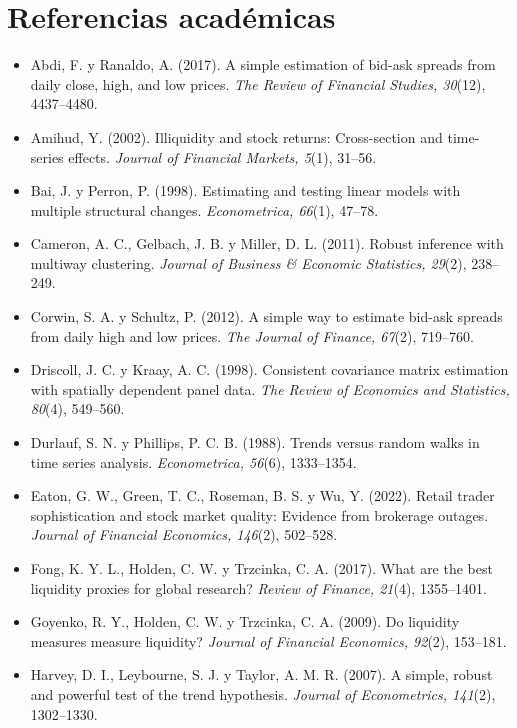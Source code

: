 \documentclass[11pt,letterpaper]{article}
\theoremstyle{definition}
\theoremstyle{plain}
\begin{document}
\section*{Referencias académicas}
\begin{itemize}[leftmargin=*,label={}]\raggedright\small
\item Abdi, F. y Ranaldo, A. (2017). A simple estimation of bid-ask spreads from daily close, high, and low prices. \emph{The Review of Financial Studies, 30}(12), 4437--4480.
\item Amihud, Y. (2002). Illiquidity and stock returns: Cross-section and time-series effects. \emph{Journal of Financial Markets, 5}(1), 31--56.
\item Bai, J. y Perron, P. (1998). Estimating and testing linear models with multiple structural changes. \emph{Econometrica, 66}(1), 47--78.
\item Cameron, A. C., Gelbach, J. B. y Miller, D. L. (2011). Robust inference with multiway clustering. \emph{Journal of Business \& Economic Statistics, 29}(2), 238--249.
\item Corwin, S. A. y Schultz, P. (2012). A simple way to estimate bid-ask spreads from daily high and low prices. \emph{The Journal of Finance, 67}(2), 719--760.
\item Driscoll, J. C. y Kraay, A. C. (1998). Consistent covariance matrix estimation with spatially dependent panel data. \emph{The Review of Economics and Statistics, 80}(4), 549--560.
\item Durlauf, S. N. y Phillips, P. C. B. (1988). Trends versus random walks in time series analysis. \emph{Econometrica, 56}(6), 1333--1354.
\item Eaton, G. W., Green, T. C., Roseman, B. S. y Wu, Y. (2022). Retail trader sophistication and stock market quality: Evidence from brokerage outages. \emph{Journal of Financial Economics, 146}(2), 502--528.
\item Fong, K. Y. L., Holden, C. W. y Trzcinka, C. A. (2017). What are the best liquidity proxies for global research? \emph{Review of Finance, 21}(4), 1355--1401.
\item Goyenko, R. Y., Holden, C. W. y Trzcinka, C. A. (2009). Do liquidity measures measure liquidity? \emph{Journal of Financial Economics, 92}(2), 153--181.
\item Harvey, D. I., Leybourne, S. J. y Taylor, A. M. R. (2007). A simple, robust and powerful test of the trend hypothesis. \emph{Journal of Econometrics, 141}(2), 1302--1330.

\end{itemize}
\end{document}
